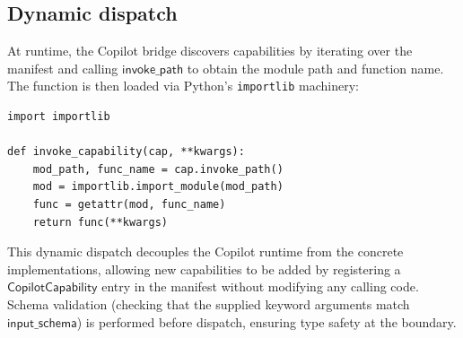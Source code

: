 \documentclass[11pt]{article}
\newcommand{\CC}{\ensuremath{\mathsf{CopilotCapability}}}
\begin{document}
\subsection{Dynamic dispatch}\label{ssec:dispatch}

At runtime, the Copilot bridge discovers capabilities by
iterating over the manifest and calling $\mathsf{invoke\_path}$
to obtain the module path and function name.  The function is
then loaded via Python's \texttt{importlib} machinery:

\begin{lstlisting}[style=jugeo-python,
  caption={Dynamic capability dispatch.},label=lst:dispatch]
import importlib

def invoke_capability(cap, **kwargs):
    mod_path, func_name = cap.invoke_path()
    mod = importlib.import_module(mod_path)
    func = getattr(mod, func_name)
    return func(**kwargs)
\end{lstlisting}

\noindent
This dynamic dispatch decouples the Copilot runtime from the
concrete implementations, allowing new capabilities to be added
by registering a $\CC$ entry in the manifest without modifying
any calling code.  Schema validation (checking that the supplied
keyword arguments match $\mathsf{input\_schema}$) is performed
before dispatch, ensuring type safety at the boundary.
\end{document}
